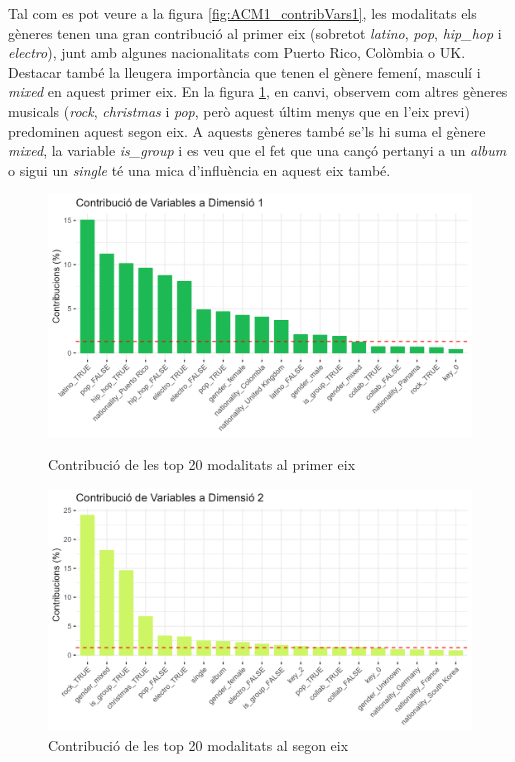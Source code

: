 Tal com es pot veure a la figura \ref{fig:ACM1_contribVars1}, les modalitats els gèneres tenen una gran contribució al primer eix (sobretot \textit{latino}, \textit{pop}, \textit{hip\_hop} i \textit{electro}), junt amb algunes nacionalitats com Puerto Rico, Colòmbia o UK. Destacar també la lleugera importància que tenen el gènere femení, masculí i \textit{mixed} en aquest primer eix. En la figura \ref{fig:ACM1_contribVars2}, en canvi, observem com altres gèneres musicals (\textit{rock}, \textit{christmas} i \textit{pop}, però aquest últim menys que en l'eix previ) predominen aquest segon eix. A aquests gèneres també se'ls hi suma el gènere \textit{mixed}, la variable \textit{is\_group} i es veu que el fet que una cançó pertanyi a un \textit{album} o sigui un \textit{single} té una mica d'influència en aquest eix també.

\begin{figure}[H]
\centering
    \begin{minipage}{.5\textwidth}
        \centering
        \includegraphics[width=0.95\linewidth]{Images/6_Factorial_Methods/ACM/ACM1_contribVars1.png}
    \caption{Contribució de les top 20 modalitats al primer eix}
    \label{fig:ACM1_contribVars1}
    \end{minipage}%
    \begin{minipage}{.5\textwidth}
        \centering
        \includegraphics[width=0.95\linewidth]{Images/6_Factorial_Methods/ACM/ACM1_contribVars2.png}
    \caption{Contribució de les top 20 modalitats al segon eix}
    \label{fig:ACM1_contribVars2}
    \end{minipage}%
\end{figure}

